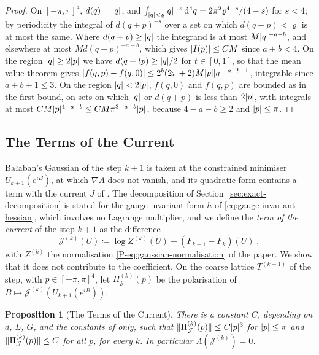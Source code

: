 \documentclass[11pt]{preprint}
\newcommand{\dd}{\mathrm{d}}
\DeclarePairedDelimiter{\abs}{\lvert}{\rvert}
\DeclarePairedDelimiter{\norm}{\lVert}{\rVert}
\numberwithin{equation}{section}
\theoremstyle{definition}
\theoremstyle{remark}
\theoremstyle{plain}
\newtheorem{auxproposition}[lemma]{Proposition}
\begin{document}
\begin{proof}
On $[-\pi, \pi]^4$, $d(q) = \abs{q}$, and $\int_{\abs{q}<\varrho}\abs{q}^{-s}\,\dd^4q = 2\pi^2\varrho^{4-s}/(4 - s)$ for $s < 4$; by periodicity the integral of $d(q + p)^{-s}$ over a set on which $d(q + p) < \varrho$ is at most the same. Where $d(q + p) \geq \abs{q}$ the integrand is at most $M\abs{q}^{-a-b}$, and elsewhere at most $Md(q + p)^{-a-b}$, which gives $\abs{I(p)} \leq CM$ since $a + b < 4$. On the region $\abs{q} \geq 2\abs{p}$ we have $d(q + tp) \geq \abs{q}/2$ for $t \in [0, 1]$, so that the mean value theorem gives $\abs{f(q, p) - f(q, 0)} \leq 2^b(2\pi + 2)M\abs{p}\abs{q}^{-a-b-1}$, integrable since $a + b + 1 \leq 3$. On the region $\abs{q} < 2\abs{p}$, $f(q, 0)$ and $f(q, p)$ are bounded as in the first bound, on sets on which $\abs{q}$ or $d(q + p)$ is less than $2\abs{p}$, with integrals at most $CM\abs{p}^{4-a-b} \leq CM\pi^{3-a-b}\abs{p}$, because $4 - a - b \geq 2$ and $\abs{p} \leq \pi$.
\end{proof}

\subsection{The Terms of the Current}\label{sec:current-terms}

Ba{\l}aban's Gaussian of the step $k + 1$ is taken at the constrained minimiser $U_{k+1}(e^{iB})$, at which $\nabla A$ does not vanish, and its quadratic form contains a term with the current $J$ of \cite[(1.8), p.~261]{BalabanRG1}. The decomposition of Section~\ref{sec:exact-decomposition} is stated for the gauge-invariant form $h$ of \eqref{eq:gauge-invariant-hessian}, which involves no Lagrange multiplier, and we define the \emph{term of the current} of the step $k + 1$ as the difference
\begin{equation}\label{eq:current-term}
    \mathcal J^{(k)}(U) \coloneqq \log Z^{(k)}(U) - (F_{k+1} - F_k)(U)\;,
\end{equation}
with $Z^{(k)}$ the normalisation \eqref{P-eq:gaussian-normalisation} of the paper. We show that it does not contribute to the coefficient. On the coarse lattice $T^{(k+1)}$ of the step, with $p \in [-\pi, \pi]^4$, let $\Pi^{(k)}_{\mathcal J}(p)$ be the polarisation of $B \mapsto \mathcal J^{(k)}(U_{k+1}(e^{iB}))$.

\begin{auxproposition}[The Terms of the Current]\label{prop:current-terms}
There is a constant $C$, depending on $d$, $L$, $G$, and the constants of \cite{BalabanPBG} only, such that $\norm{\Pi^{(k)}_{\mathcal J}(p)} \leq C\abs{p}^3$ for $\abs{p} \leq \pi$ and $\norm{\Pi^{(k)}_{\mathcal J}(p)} \leq C$ for all $p$, for every $k$. In particular $\Lambda(\mathcal J^{(k)}) = 0$.
\end{auxproposition}
\end{document}
